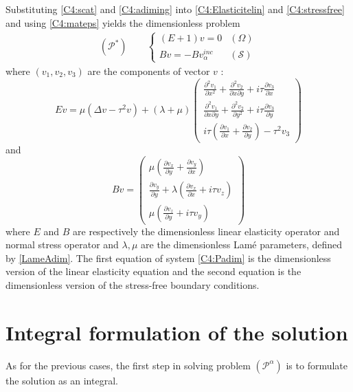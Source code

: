 Substituting \eqref{C4:scat} and \eqref{C4:adiming} into \eqref{C4:Elasticitelin} and \eqref{C4:stressfree} and using \eqref{C4:mateps} yields the dimensionless problem
\begin{eqnarray}
(\mathcal{P}^*) \hspace{2em} \left\{
\begin{array}{lr}
(E+1)v=0 & (\Omega) \\
Bv=-Bv_{\alpha}^{inc} & (\mathcal{S})
\end{array}
\right.
\label{C4:Padim}
\end{eqnarray}
where $(v_1,v_2,v_3)$ are the components of vector $v$ :
\begin{equation}
Ev=\mu (\Delta v -\tau^2 v)+(\lambda+\mu)
\begin{pmatrix}
\frac{\partial^2 v_1}{\partial x^2}+\frac{\partial^2 v_2}{\partial x \partial y} + i\tau\frac{\partial v_3}{\partial x} \\
\frac{\partial^2 v_1}{\partial x \partial y}+\frac{\partial^2 v_2}{\partial y^2}+ i\tau\frac{\partial v_3}{\partial y}\\
i\tau\left( \frac{\partial v_1}{\partial x}+\frac{\partial v_2}{\partial y}\right)-\tau^2 v_3
\end{pmatrix}
\label{C4:Eadim}
\end{equation}
and
\begin{equation}
Bv=\begin{pmatrix}
\mu \left(\frac{\partial v_x}{\partial y}+\frac{\partial v_y}{\partial x}\right) \\
\frac{\partial v_y}{\partial y}+\lambda\left( \frac{\partial v_x}{\partial x}+i\tau v_z\right)\\
\mu \left(\frac{\partial v_z}{\partial y}+i\tau v_y\right)
\end{pmatrix}
\label{C4:Badim}
\end{equation}
where $E$ and $B$ are respectively the dimensionless linear elasticity operator and normal stress operator and $\lambda,\mu$ are the dimensionless Lamé parameters, defined by \eqref{LameAdim}. The first equation of system \eqref{C4:Padim} is the dimensionless version of the linear elasticity equation and the second equation is the dimensionless version of the stress-free boundary conditions.

\section{Integral formulation of the solution}
As for the previous cases, the first step in solving problem $(\mathcal{P}^{\alpha})$ is to formulate the solution as an integral. 
